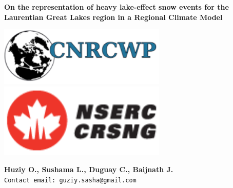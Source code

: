 \documentclass[a0b,landscape]{a0poster}
\begin{document}
\captionsetup{justification=raggedright}



\noindent\begin{minipage}[b]{\linewidth}
\centering
\noindent \huge \color{NavyBlue} \textbf{On the representation of heavy lake-effect snow events for the Laurentian Great Lakes region in a Regional Climate Model} \color{Black}\\[0.25cm] %
\noindent\begin{minipage}[c]{0.25\linewidth}
      \center
      \includegraphics[width=8cm, align=c]{logo_cnrcwp.png} \includegraphics[width=8cm, align=c]{nserc_narrow} %
\end{minipage}
%
\hfill
%
\begin{minipage}[c]{0.45\linewidth}
  \center
  \large \textbf{Huziy O., Sushama L., Duguay C., Baijnath J.} \\[0.5cm]
  \large \texttt{Contact email: guziy.sasha@gmail.com}
\end{minipage}
%
\hfill
%
\begin{minipage}[c]{0.25\linewidth}
  \center

\end{minipage}
\end{minipage}
\end{document}
